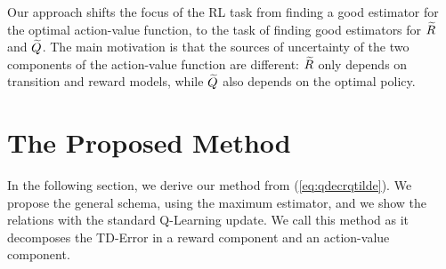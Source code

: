 \documentclass[conference]{IEEEtran}
\begin{document}
Our approach shifts the focus of the RL task from finding a good estimator for the optimal action-value function, to the task of finding good estimators for $\widetilde{R}$ and $\widetilde{Q}$. The main motivation is that the sources of uncertainty of the two components of the action-value function are different: $\widetilde{R}$ only depends on transition and reward models, while $\widetilde{Q}$ also depends on the optimal policy.
\section{The Proposed Method}
In the following section, we derive our method from (\ref{eq:qdecrqtilde}). We propose the general schema, using the maximum estimator, and we show the relations with the standard Q-Learning update. We call this method \emph{\alg} as it decomposes the TD-Error in a reward component and an action-value component.
\end{document}
